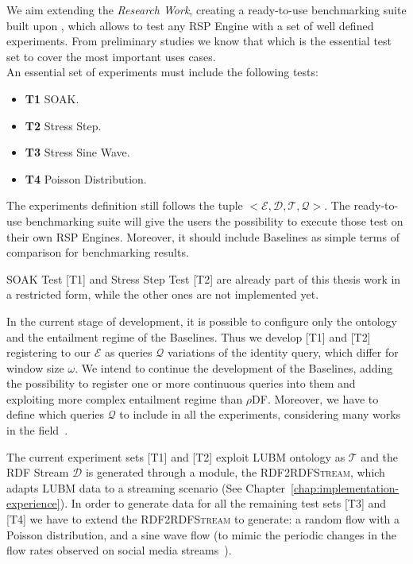 \noindent We aim extending the \textit{Research Work}, creating a ready-to-use benchmarking suite built upon \namens, which allows to test any RSP Engine with a set of well defined experiments. From preliminary studies we know that which is the essential test set to cover the most important uses cases.\\

An essential set of experiments must include the following tests:
\begin{itemize}
\item \textbf{T1} SOAK.
\item \textbf{T2} Stress Step.
\item \textbf{T3} Stress Sine Wave.
\item \textbf{T4} Poisson Distribution.
\end{itemize}

The experiments definition still follows the tuple $<\mathcal{E},\mathcal{D},\mathcal{T},\mathcal{Q}>$. The ready-to-use benchmarking suite will give the users the possibility to execute those test on their own RSP Engines. Moreover, it should include \name Baselines as simple terms of comparison for benchmarking results.

SOAK Test [T1] and Stress Step Test [T2] are already part of this thesis work in a restricted form, while the other ones are not implemented yet. 

In the current stage of development, it is possible to configure only the ontology and the entailment regime of the Baselines. Thus we develop [T1] and [T2] registering to our $\mathcal{E}$ as queries $\mathcal{Q}$ variations of the identity query, which differ for window size $\omega$. We intend to continue the development of the Baselines, adding the possibility to register one or more continuous queries into them and exploiting more complex entailment regime than $\rho$DF. Moreover, we have to define which queries $\mathcal{Q}$ to include in all the experiments, considering many works in the field~\cite{DBLP:conf/esws/ScharrenbachUMVB13, Zhang2012, LePhuoc2012c, DBLP:conf/semweb/DellAglioCBCV13}.

The current experiment sets [T1] and [T2] exploit LUBM ontology as $\mathcal{T}$ and the RDF Stream $\mathcal{D}$ is generated through a module, the \textsc{RDF2RDFStream}, which adapts LUBM data to a streaming scenario (See Chapter~\ref{chap:implementation-experience}). In order to generate data for all the remaining test sets [T3] and [T4] we have to extend the \textsc{RDF2RDFStream} to generate: a random flow with a Poisson distribution, and a sine wave flow (to mimic the periodic changes in the flow rates observed on social media streams~\cite{DBLP:conf/semweb/BalduiniVDTPC13}).

